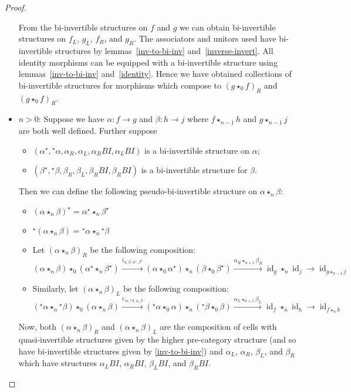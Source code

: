 \documentclass{article}
\theoremstyle{definition}
\theoremstyle{remark}
\DeclareMathOperator{\id}{id}
\newcommand{\linv}[1]{{}^\star\!#1}
\newcommand{\rinv}[1]{#1^\star}
\newcommand{\comp}{\star}
\begin{document}
\begin{proof}
\begin{itemize}
    From the bi-invertible structures on \(f\) and \(g\) we can obtain bi-invertible structures on \(f_L\), \(g_L\), \(f_R\), and \(g_R\). The associators and unitors used have bi-invertible structures by lemmas~\ref{inv-to-bi-inv} and~\ref{inverse-invert}. All identity morphisms can be equipped with a bi-invertible structure using lemmas~\ref{inv-to-bi-inv} and~\ref{identity}. Hence we have obtained collections of bi-invertible structures for morphisms which compose to \({(g \comp_0 f)}_R\) and \({(g \comp_0 f)}_R\).
  \item \(n > 0\): Suppose we have \(\alpha: f \to g\) and \(\beta: h \to j\) where \(f \comp_{n-1} h\) and \(g \comp_{n-1} j\) are both well defined. Further suppose
    \begin{itemize}
    \item \((\rinv \alpha, \linv \alpha, \alpha_R, \alpha_L, \alpha_R{}BI, \alpha_L{}BI)\) is a bi-invertible structure on \(\alpha\);
    \item \((\rinv \beta, \linv \beta, \beta_R, \beta_L, \beta_R{}BI, \beta_R{}BI)\) is a bi-invertible structure for \(\beta\).
    \end{itemize}
    Then we can define the following pseudo-bi-invertible structure on \(\alpha \comp_n \beta\):
    \begin{itemize}
    \item \(\rinv {(\alpha \comp_n \beta)} = \rinv \alpha \comp_n \rinv \beta\)
    \item \(\linv {(\alpha \comp_n \beta)} = \linv \alpha \comp_n \linv \beta\)
    \item Let \({(\alpha \comp_n \beta)}_R\) be the following composition:
      \begin{equation*}
        (\alpha \comp_n \beta) \comp_0 (\rinv \alpha \comp_n \rinv \beta) \overset {i_{\alpha,\beta,\rinv \alpha, \rinv \beta}} \to (\alpha \comp_0 \rinv \alpha) \comp_n (\beta \comp_0 \rinv \beta) \overset {\alpha_R \comp_{n+1} \beta_R} \to \id_g \comp_n \id_j \to \id_{g \comp_{n-1} j}
      \end{equation*}
    \item Similarly, let \({(\alpha \comp_n \beta)}_L\) be the following composition:
      \begin{equation*}
        (\linv \alpha \comp_n \linv \beta) \comp_0 (\alpha \comp_n \beta) \overset {i_{\linv \alpha, \linv \beta, \alpha, \beta}} \to (\linv \alpha \comp_0 \alpha) \comp_n (\linv \beta \comp_0 \beta) \overset {\alpha _L \comp_{n+1} \beta _L} \to \id_f \comp_n \id_h \to \id_{f \comp_n h}
      \end{equation*}
    \end{itemize}
    Now, both \({(\alpha \comp_n \beta)}_R\) and \({(\alpha \comp_n \beta)}_L\) are the composition of cells with quasi-invertible structures given by the higher pre-category structure (and so have bi-invertible structures given by \cref{inv-to-bi-inv}) and \(\alpha_L\), \(\alpha_R\), \(\beta_L\), and \(\beta_R\) which have structures \(\alpha_L{}BI\), \(\alpha_R{}BI\), \(\beta_L{}BI\), and \(\beta_R{}BI\).
  \end{itemize}
\end{proof}
\end{document}
